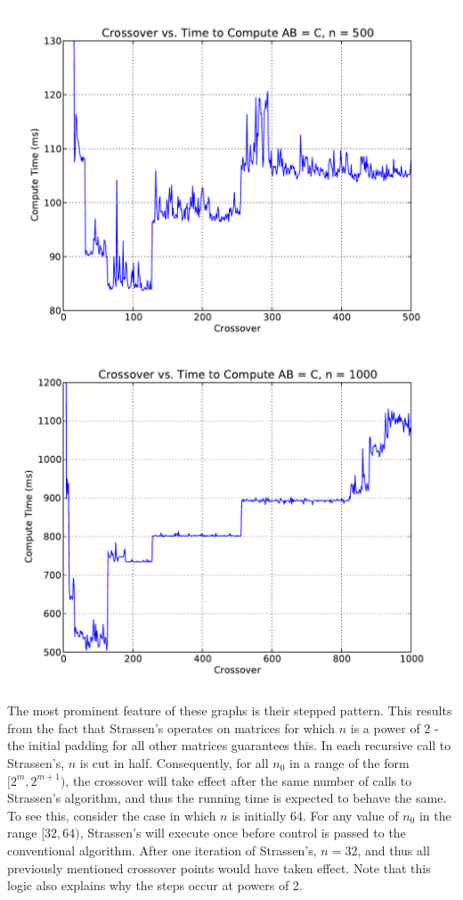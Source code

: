 \documentclass[solution, letterpaper]{cs121}
\begin{document}
\begin{center}
\includegraphics[scale=0.8]{crossover-v-compute-time-500-msec.pdf}
\includegraphics[scale=0.8]{crossover-v-compute-time-1000-msec.pdf}
\end{center}

The most prominent feature of these graphs is their stepped pattern. This results from the fact that Strassen's operates on matrices for which $n$ is a power of 2 - the initial padding for all other matrices guarantees this. In each recursive call to Strassen's, $n$ is cut in half. Consequently, for all $n_0$ in a range of the form $[2^m, 2^{m+1})$, the crossover will take effect after the same number of calls to Strassen's algorithm, and thus the running time is expected to behave the same. To see this, consider the case in which $n$ is initially 64. For any value of $n_0$ in the range $[32,64)$, Strassen's will execute once before control is passed to the conventional algorithm. After one iteration of Strassen's, $n= 32$, and thus all previously mentioned crossover points would have taken effect. Note that this logic also explains why the steps occur at powers of 2.
\end{document}
